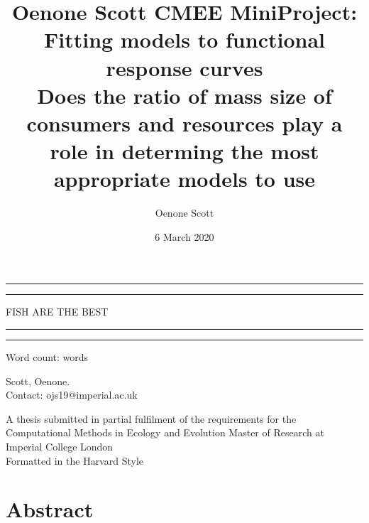 \documentclass[11pt]{article}
\title {Oenone Scott CMEE MiniProject: Fitting models to functional response 
curves \\ Does the ratio of mass size of consumers and resources play a role in 
determing the most appropriate models to use}
\author{Oenone Scott}
\date{6 March 2020}
\newcommand\wordcount{}
\begin{document}
\begin{titlepage}


	\centering %
		
	
	
	
	\vspace*{3\baselineskip}
	
	\rule{\textwidth}{1.6pt}\vspace*{-\baselineskip}\vspace*{2pt} %
	\rule{\textwidth}{0.4pt} %
	
	\vspace{0.75\baselineskip} %
	
	{\LARGE FISH ARE THE BEST  \\} 
	
	\vspace{0.75\baselineskip} %
	
	\rule{\textwidth}{0.4pt}\vspace*{-\baselineskip}\vspace{3.2pt} 
	\rule{\textwidth}{1.6pt} 
	
	\vspace{2\baselineskip} 
	
	
	Word count: 	
	\wordcount words
		
	\vspace{0.5 \baselineskip} %
	

	Scott, Oenone. \\
	
	Contact: ojs19@imperial.ac.uk
	
	\vspace*{1\baselineskip}
	
	A thesis submitted in partial fulfilment of the requirements for the 
	Computational Methods in Ecology and Evolution Master of Research at 
	Imperial College London \\
	Formatted in the Harvard Style \\

\end{titlepage}

\linenumbers

\section{Abstract}
\noindent
\end{document}
